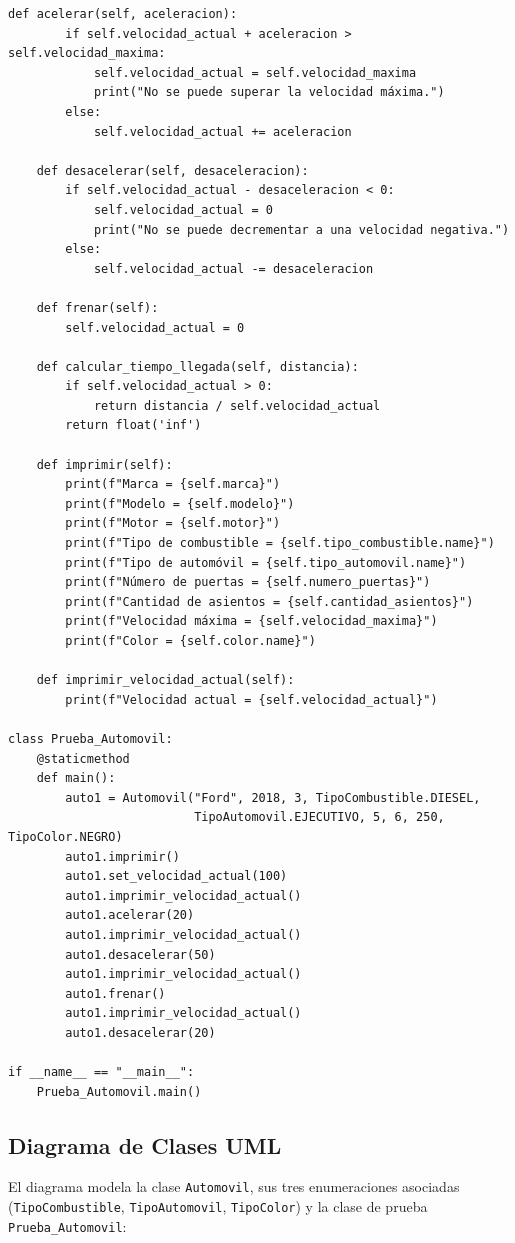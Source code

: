 \documentclass[11pt,a4paper]{article}
\begin{document}
\begin{lstlisting}[caption={Implementación de la clase Automóvil y pruebas (\texttt{Actividad2\_Ejercicio2\_3\_Automovil.py})}]
    def acelerar(self, aceleracion):
        if self.velocidad_actual + aceleracion > self.velocidad_maxima:
            self.velocidad_actual = self.velocidad_maxima
            print("No se puede superar la velocidad máxima.")
        else:
            self.velocidad_actual += aceleracion

    def desacelerar(self, desaceleracion):
        if self.velocidad_actual - desaceleracion < 0:
            self.velocidad_actual = 0
            print("No se puede decrementar a una velocidad negativa.")
        else:
            self.velocidad_actual -= desaceleracion

    def frenar(self):
        self.velocidad_actual = 0

    def calcular_tiempo_llegada(self, distancia):
        if self.velocidad_actual > 0:
            return distancia / self.velocidad_actual
        return float('inf')

    def imprimir(self):
        print(f"Marca = {self.marca}")
        print(f"Modelo = {self.modelo}")
        print(f"Motor = {self.motor}")
        print(f"Tipo de combustible = {self.tipo_combustible.name}")
        print(f"Tipo de automóvil = {self.tipo_automovil.name}")
        print(f"Número de puertas = {self.numero_puertas}")
        print(f"Cantidad de asientos = {self.cantidad_asientos}")
        print(f"Velocidad máxima = {self.velocidad_maxima}")
        print(f"Color = {self.color.name}")

    def imprimir_velocidad_actual(self):
        print(f"Velocidad actual = {self.velocidad_actual}")

class Prueba_Automovil:
    @staticmethod
    def main():
        auto1 = Automovil("Ford", 2018, 3, TipoCombustible.DIESEL,
                          TipoAutomovil.EJECUTIVO, 5, 6, 250, TipoColor.NEGRO)
        auto1.imprimir()
        auto1.set_velocidad_actual(100)
        auto1.imprimir_velocidad_actual()
        auto1.acelerar(20)
        auto1.imprimir_velocidad_actual()
        auto1.desacelerar(50)
        auto1.imprimir_velocidad_actual()
        auto1.frenar()
        auto1.imprimir_velocidad_actual()
        auto1.desacelerar(20)

if __name__ == "__main__":
    Prueba_Automovil.main()
\end{lstlisting}

\subsection{Diagrama de Clases UML}
El diagrama modela la clase \texttt{Automovil}, sus tres enumeraciones asociadas (\texttt{TipoCombustible}, \texttt{TipoAutomovil}, \texttt{TipoColor}) y la clase de prueba \texttt{Prueba\_Automovil}:
\end{document}
